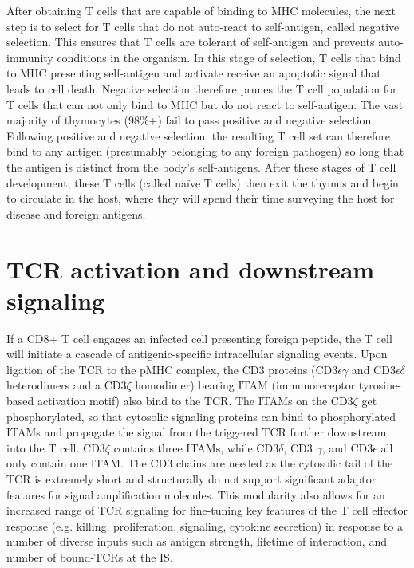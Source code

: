 After obtaining T cells that are capable of binding to MHC molecules, the next step is to select for T cells that do not auto-react to self-antigen, called negative selection. This ensures that T cells are tolerant of self-antigen and prevents auto-immunity conditions in the organism. In this stage of selection, T cells that bind to MHC presenting self-antigen and activate receive an apoptotic signal that leads to cell death. Negative selection therefore prunes the T cell population for T cells that can not only bind to MHC but do not react to self-antigen. The vast majority of thymocytes (98\%+) fail to pass positive and negative selection. Following positive and negative selection, the resulting T cell set can therefore bind to any antigen (presumably belonging to any foreign pathogen) so long that the antigen is distinct from the body’s self-antigens. 
After these stages of T cell development, these T cells (called naïve T cells) then exit the thymus and begin to circulate in the host, where they will spend their time surveying the host for disease and foreign antigens.

\section{TCR activation and downstream signaling}
	\label{TCR activation and downstream signaling}
If a CD8+ T cell engages an infected cell presenting foreign peptide, the T cell will initiate a cascade of antigenic-specific intracellular signaling events. Upon ligation of the TCR to the pMHC complex, the CD3 proteins (CD3$\epsilon \gamma$ and CD3$\epsilon \delta$ heterodimers and a CD3$\zeta$ homodimer) bearing ITAM (immunoreceptor tyrosine-based activation motif) also bind to the TCR.  The ITAMs on the CD3$\zeta$ get phosphorylated, so that cytosolic signaling proteins can bind to phosphorylated ITAMs and propagate the signal from the triggered TCR further downstream into the T cell. CD3$\zeta$ contains three ITAMs, while CD3$\delta$, CD3 $\gamma$, and CD3$\epsilon$ all only contain one ITAM. The CD3 chains are needed as the cytosolic tail of the TCR is extremely short and structurally do not support significant adaptor features for signal amplification molecules. This modularity also allows for an increased range of TCR signaling for fine-tuning key features of the T cell effector response (e.g. killing, proliferation, signaling, cytokine secretion) in response to a number of diverse inputs such as antigen strength, lifetime of interaction, and number of bound-TCRs at the IS.

